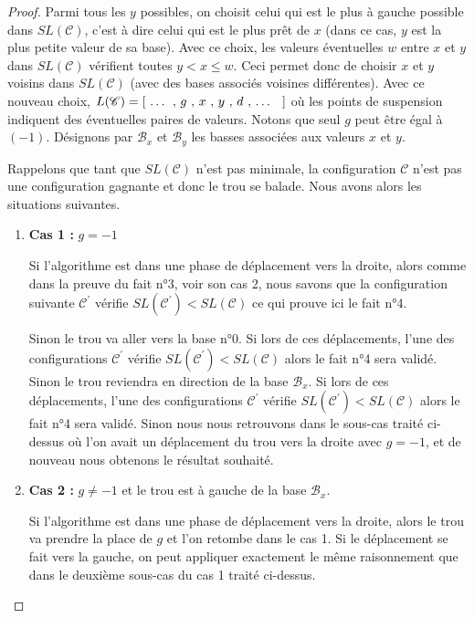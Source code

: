 \begin{proof}
	\medskip
	
	Parmi tous les $y$ possibles, on choisit celui qui est le plus à gauche possible dans $SL(\mathscr{C})$, c'est à dire celui qui est le plus prêt de $x$ (dans ce cas, $y$ est la plus petite valeur de sa base).
	Avec ce choix, les valeurs éventuelles $w$ entre $x$ et $y$ dans $SL(\mathscr{C})$ vérifient toutes $y < x \leqslant w$. Ceci permet donc de choisir $x$ et $y$ voisins dans $SL(\mathscr{C})$ (avec des bases associés voisines différentes).
	Avec ce nouveau choix, $L(\mathscr{C}) = [ \text{\ \dots{} , $g$ , $x$ , $y$ , $d$ , \dots{} \ } ]$ où les points de suspension indiquent des éventuelles paires de valeurs. Notons que seul $g$ peut être égal à $(-1)$.
	Désignons par $\mathcal{B}_x$ et $\mathcal{B}_y$ les basses associées aux valeurs $x$ et $y$.
	
	
	\medskip
	
	Rappelons que tant que $SL(\mathscr{C})$ n'est pas minimale, la configuration $\mathscr{C}$ n'est pas une configuration gagnante et donc le trou se balade. Nous avons alors les situations suivantes.
	
	\begin{enumerate}
		\item \textbf{Cas 1 :} $g = -1$
		
		Si l'algorithme est dans une phase de déplacement vers la droite, alors comme dans la preuve du fait n°3, voir son cas 2, nous savons que la configuration suivante $\mathscr{C}^\prime$ vérifie $SL(\mathscr{C}^\prime) < SL(\mathscr{C})$ ce qui prouve ici le fait n°4.
		
		Sinon le trou va aller vers la base n°0. Si lors de ces déplacements, l'une des configurations $\mathscr{C}^\prime$ vérifie $SL(\mathscr{C}^\prime) < SL(\mathscr{C})$ alors le fait n°4 sera validé. Sinon le trou reviendra en direction de la base $\mathcal{B}_x$. Si lors de ces déplacements, l'une des configurations $\mathscr{C}^\prime$ vérifie $SL(\mathscr{C}^\prime) < SL(\mathscr{C})$ alors le fait n°4 sera validé. Sinon nous nous retrouvons dans le sous-cas traité ci-dessus où l'on avait un déplacement du trou vers la droite avec $g = -1$, et de nouveau nous obtenons le résultat souhaité.
		
		\item \textbf{Cas 2 :} $g \neq -1$ et le trou est à gauche de la base $\mathcal{B}_x$. 
		
		Si l'algorithme est dans une phase de déplacement vers la droite, alors le trou va prendre la place de $g$ et l'on retombe dans le cas 1. Si le déplacement se fait vers la gauche, on peut appliquer exactement le même raisonnement que dans le deuxième sous-cas du cas 1 traité ci-dessus.
		

\end{enumerate}
\end{proof}
